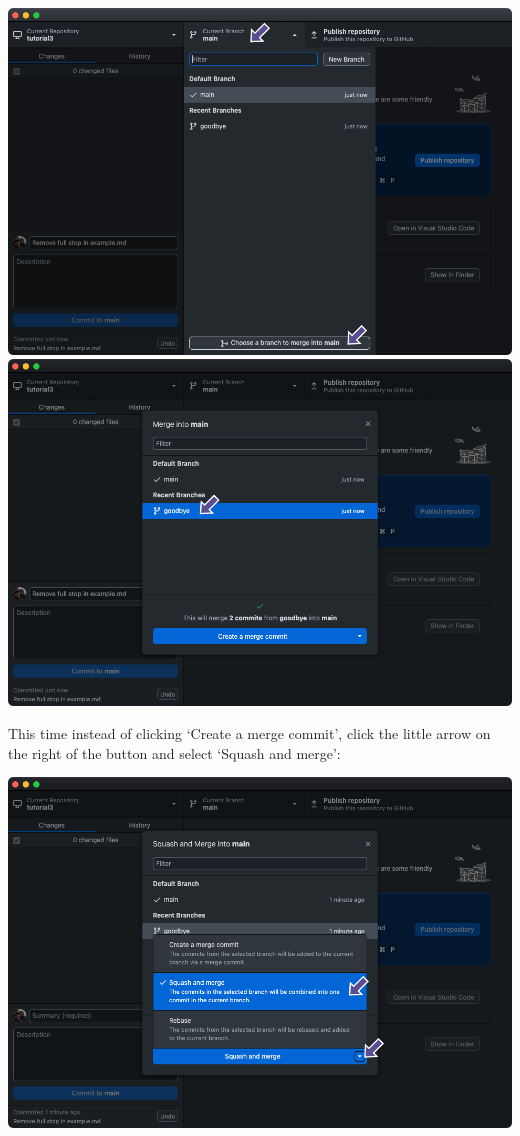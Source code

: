 \documentclass[
  letterpaper,
  DIV=11,
  numbers=noendperiod]{scrartcl}
\begin{document}
\includegraphics{images/image70.png}
\includegraphics{images/image71.png}

This time instead of clicking `Create a merge commit', click the little
arrow on the right of the button and select `Squash and merge':

\includegraphics{images/image72.png}
\end{document}
